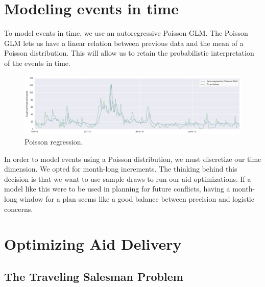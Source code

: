 \documentclass[a0,final]{a0poster}
\begin{document}
\begin{multicols}{3}
\columnbreak

\vspace{-10mm}

\section*{Modeling events in time}

\vspace{-6mm}

To model events in time, we use an autoregressive Poisson GLM. The Poisson GLM lets us have a linear relation between previous data and the mean of a Poisson distribution. This will allow us to retain the probabilistic interpretation of the events in time.

\begin{figure}[H]
\centering
\includegraphics[scale=1]{../write-up/figures/poisson-regression.png}
\caption{Poisson regression.}
\label{fig:poisson}
\end{figure}

\noindent In order to model events using a Poisson distribution, we must discretize our time dimension. We opted for month-long increments. The thinking behind this decision is that we want to use sample draws to run our aid optimizations. If a model like this were to be used in planning for future conflicts, having a month-long window for a plan seems like a good balance between precision and logistic concerns.

\section*{Optimizing Aid Delivery}

\vspace{-6mm}

\subsection*{The Traveling Salesman Problem}

\vspace{-6mm}


\end{multicols}
\end{document}
